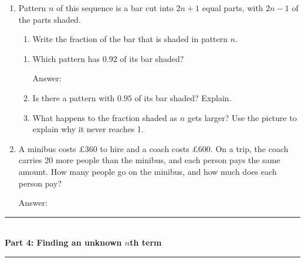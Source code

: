 \documentclass[11pt,a4paper]{article}
\newcommand{\ansline}[1][2.2cm]{\underline{\hspace{#1}}}
\newcommand{\workspace}[1]{\par\vspace{#1}\hfill Answer: \ansline[3.5cm]\par}
\newcommand{\parttitle}[2]{%
  \vspace{1pt}
  {\color{blue!45!black}\rule{\linewidth}{1pt}}\\[1pt]
  {\large\bfseries Part #1: #2}\\[-6pt]
  {\color{blue!45!black}\rule{\linewidth}{0.4pt}}
  \par\vspace{-5pt}}
\newcommand{\fracbar}[1]{%
  \pgfmathtruncatemacro{\parts}{2*#1+1}
  \pgfmathtruncatemacro{\shaded}{2*#1-1}
  \foreach \k in {1,...,\parts} {
    \ifnum\k>\shaded\relax \def\barfill{white}\else \def\barfill{gray!40}\fi
    \draw[fill=\barfill,line width=0.5pt] ({2.8*(\k-1)/\parts},0) rectangle ({2.8*\k/\parts},0.3);}}
\begin{document}
\begin{enumerate}[resume]
\newpage
\item \begin{minipage}[t]{0.56\linewidth}
  Pattern $n$ of this sequence is a bar cut into $2n+1$ equal parts, with
  $2n-1$ of the parts shaded.
  \begin{enumerate}
  \item Write the fraction of the bar that is shaded in pattern $n$. \ansline[1.6cm]
  \end{enumerate}
  \end{minipage}\hfill
  \begin{minipage}[t]{0.42\linewidth}\raggedleft\vspace{0pt}
  \end{minipage}
  \begin{enumerate}[start=2]
  \item Which pattern has $0.92$ of its bar shaded?
    \workspace{1.0cm}
  \item Is there a pattern with $0.95$ of its bar shaded? Explain.
    \vspace{0.8cm}\par\hrulefill
  \item What happens to the fraction shaded as $n$ gets larger? Use the picture to
    explain why it never reaches 1. \hrulefill
  \end{enumerate}

\item A minibus costs \pounds360 to hire and a coach costs \pounds600. On a trip, the
coach carries 20 more people than the minibus, and each person pays the same amount.
How many people go on the minibus, and how much does each person pay?
\workspace{1.3cm}
\end{enumerate}

\parttitle{4}{Finding an unknown \boldmath$n$th term}
\end{document}
